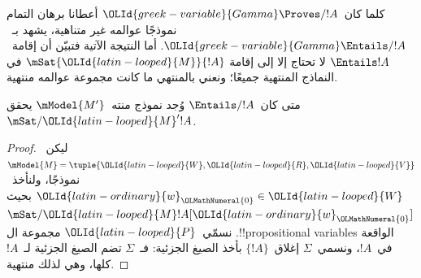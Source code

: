 \documentclass[../../../include/open-logic-section]{subfiles}
\begin{document}


كلما كان~${\OLId{greek-variable}{Gamma}} \Proves/ !A$ أعطانا برهان التمام نموذجًا عوالمه غير
متناهية، يشهد بـ~${\OLId{greek-variable}{Gamma}} \Entails/ !A$. أما النتيجة الآتية فتبيّن أن
إقامة~$\Entails !A$ لا تحتاج إلا إلى إقامة
$\mSat{{\OLId{latin-looped}{M}}}{!A}$ في النماذج المنتهية جميعًا؛ ونعني بالمنتهي ما كانت
مجموعة عوالمه منتهية.

\begin{thm}
  متى كان~$\Entails/ !A$ وُجد نموذج منته~$\mModel{M'}$ يحقق
  $\mSat/{{\OLId{latin-looped}{M}}'}{!A}$.
\end{thm}

\begin{proof}
  ليكن~$\mModel{M}=\tuple{{\OLId{latin-looped}{W}},{\OLId{latin-looped}{R}},{\OLId{latin-looped}{V}}}$ نموذجًا، ولنأخذ~${\OLId{latin-ordinary}{w}}_{\OLMathNumeral{0}}\in {\OLId{latin-looped}{W}}$ بحيث
  $\mSat/{{\OLId{latin-looped}{M}}}{!A}[{\OLId{latin-ordinary}{w}}_{\OLMathNumeral{0}}]$. نسمّي~${\OLId{latin-looped}{P}}$ مجموعة ال!!{propositional variable}s
  الواقعة في~$!A$، ونسمي~$\Sigma$ إغلاق~$\{!A\}$ بأخذ
  الصيغ الجزئية: فـ~$\Sigma$ تضم الصيغ الجزئية
  لـ~$!A$ كلها، وهي لذلك منتهية.


\end{proof}
\end{document}
